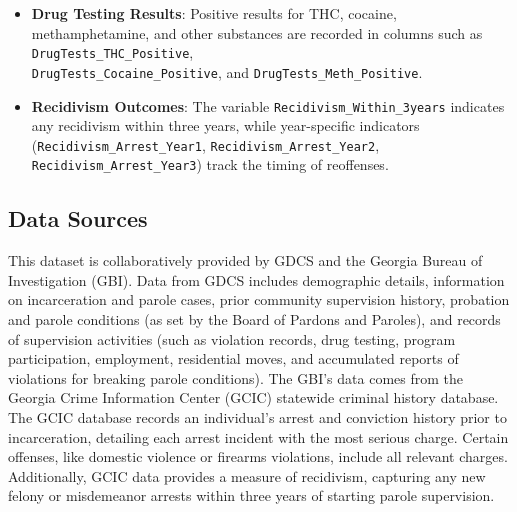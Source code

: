 \documentclass[12pt]{article}
\begin{document}
\begin{itemize}
    \item \textbf{Drug Testing Results}: Positive results for THC, cocaine, methamphetamine, and other substances are recorded in columns such as \texttt{DrugTests\_THC\_Positive}, \\\texttt{DrugTests\_Cocaine\_Positive}, and \texttt{DrugTests\_Meth\_Positive}.
    
    \item \textbf{Recidivism Outcomes}: The variable \texttt{Recidivism\_Within\_3years} indicates any recidivism within three years, while year-specific indicators (\texttt{Recidivism\_Arrest\_Year1}, \texttt{Recidivism\_Arrest\_Year2}, \texttt{Recidivism\_Arrest\_Year3}) track the timing of reoffenses.
\end{itemize}



\subsection{Data Sources}
This dataset is collaboratively provided by GDCS and the Georgia Bureau of Investigation (GBI). Data from GDCS includes demographic details, information on incarceration and parole cases, prior community supervision history, probation and parole conditions (as set by the Board of Pardons and Paroles), and records of supervision activities (such as violation records, drug testing, program participation, employment, residential moves, and accumulated reports of violations for breaking parole conditions). The GBI’s data comes from the Georgia Crime Information Center (GCIC) statewide criminal history database. The GCIC database records an individual's arrest and conviction history prior to incarceration, detailing each arrest incident with the most serious charge. Certain offenses, like domestic violence or firearms violations, include all relevant charges. Additionally, GCIC data provides a measure of recidivism, capturing any new felony or misdemeanor arrests within three years of starting parole supervision.
\end{document}

